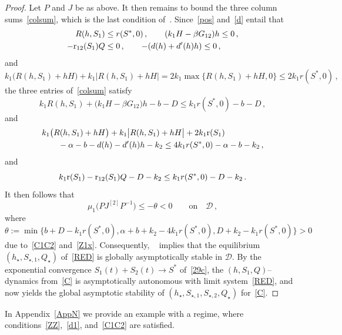 \documentclass[reqno,11pt]{amsart}
\numberwithin{equation}{section}
\begin{document}
\begin{proof}
Let $P$  and $J$ be as above. It then remains to bound the three column sums~\eqref{colsum}, which is the last condition of~\cite{LiMuldowney1996}. Since~\eqref{pos} and~\eqref{d} entail that
\begin{align*}
R(h,S_1)&\le r(S^*,0)\,,\qquad(k_1 H-\beta G_{12})h\le0\,,\\
 -{\rm r}_{12}(S_1)Q&\le0\,,\qquad -(d(h)+d'(h)h)\le0\,,
\end{align*}
and
\[
k_1\big(R(h,S_1)+hH\big)+k_1\big|R(h,S_1)+hH\big|=2k_1\max\big\{R(h,S_1)+hH, 0\big\}\le 2k_1 r(S^*,0)\,,
\]
the three entries of~\eqref{colsum} satisfy
\[
k_1 R(h,S_1)+\big(k_1 H-\beta G_{12}\big)h-b-D\le k_1 r(S^*,0)-b-D\,,
\]
and 
\begin{align*}
&k_1\big(R(h,S_1)+hH\big)+k_1\big|R(h,S_1)+hH\big|+2k_1 {\rm r}(S_1)\\
&\qquad -\alpha-b-d(h)-d'(h)h-k_2\le 4 k_1 r(S^*,0)-\alpha-b-k_2\,,
\end{align*}
and 
\[
k_1 {\rm r}(S_1)-{\rm r}_{12}(S_1) Q-D-k_2\le k_1 r(S^*,0)-D-k_2\,.
\]
It then follows that
\[
\mu_1\big(PJ^{[2]}P^{-1}\big)\le-\theta<0\qquad\text{on}\quad\mathcal D\,,
\]
where
\[
\theta:=\min\big\{b+D-k_1 r(S^*,0), \alpha+b+k_2-4k_1 r(S^*,0), D+k_2-k_1 r(S^*,0)\big\}>0
\]
 due to~\eqref{C1C2} and~\eqref{Z1x}.
 Consequently, ~\cite[Theorem~3.5]{LiMuldowney1996} implies that the equilibrium $(h_\star,S_{\star,1},Q_\star)$  of~\eqref{RED} is globally asymptotically stable in $\mathcal{D}$.
By the exponential convergence $S_1(t)+S_2(t)\to S^*$ of~\eqref{29c}, the $(h,S_1,Q)$--dynamics
from~\eqref{C} is asymptotically autonomous with limit system~\eqref{RED}, and~\cite[Theorem~4.1]{Thieme1992}
now yields the global asymptotic stability of $(h_\star,S_{\star,1},S_{\star,2},Q_\star)$ for~\eqref{C}.
\end{proof}

 In Appendix~\ref{AppN} we provide an example with a regime, where conditions~\eqref{ZZ},~\eqref{d1}, and~\eqref{C1C2} are satisfied.
\end{document}
